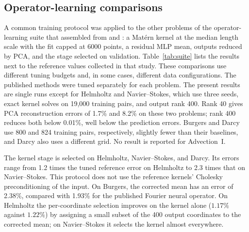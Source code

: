 \subsection{Operator-learning comparisons}
\label{sec:suite}
A common training protocol was applied to the other
problems of the operator-learning suite that \citet{batlle2024kernel}
assembled from \citet{dehoop2022cost} and \citet{lu2022comprehensive}: a
Mat\'ern kernel at the median length scale with the fit capped at 6000
points, a residual MLP mean, outputs reduced by PCA, and the stage selected on
validation. Table~\ref{tab:suite} lists the results next to the reference
values collected in that study. These comparisons use different tuning
budgets and, in some cases, different data configurations. The published
methods were tuned separately for each problem. The present results are
single runs except for Helmholtz and Navier--Stokes, which use three seeds,
exact kernel solves on 19{,}000 training pairs, and output rank 400.
Rank 40 gives PCA reconstruction errors of 1.7\% and 8.2\% on these two
problems; rank 400 reduces both below 0.01\%, well below the prediction
errors. Burgers and Darcy use 800 and 824 training pairs, respectively,
slightly fewer than their baselines, and Darcy also uses a different grid.
No result is reported for Advection~I.

The kernel stage is selected on Helmholtz, Navier--Stokes, and Darcy.
Its errors range from 1.2 times the tuned reference error on Helmholtz to
2.3 times that on Navier--Stokes. This protocol does not use the
reference kernels' Cholesky preconditioning of the input. On Burgers, the
corrected mean has an error of 2.38\%, compared with 1.93\% for the
published Fourier neural operator. On Helmholtz the
per-coordinate selection improves on the kernel alone ($1.17\%$ against
$1.22\%$) by assigning a small subset of the 400 output coordinates to the
corrected mean; on Navier--Stokes it selects the kernel almost everywhere.

